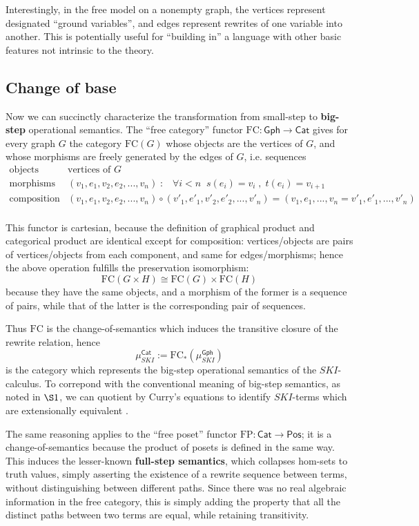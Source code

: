 \documentclass{amsart}
\theoremstyle{definition}
\newcommand{\Gph}{\mathsf{Gph}}
\newcommand{\Cat}{\mathsf{Cat}}
\newcommand{\Pos}{\mathsf{Pos}}
\newcommand{\FC}{\mathrm{FC}}
\newcommand{\FP}{\mathrm{FP}}
\newcommand{\maps}{\colon}
\begin{document}
Interestingly, in the free model on a nonempty graph, the vertices represent designated ``ground variables'', and edges represent rewrites of one variable into another. This is potentially useful for ``building in'' a language with other basic features not intrinsic to the theory.

\subsection{Change of base}
Now we can succinctly characterize the transformation from small-step to \textbf{big-step} operational semantics. The ``free category'' functor $\FC\maps \Gph \to \Cat$ gives for every graph $G$ the category $\FC(G)$ whose objects are the vertices of $G$, and whose morphisms are freely generated by the edges of $G$, i.e. sequences 
\[\begin{array}{rl}
\text{objects} & \text{vertices of } G\\
\text{morphisms} & (v_1,e_1,v_2,e_2,...,v_n) \; : \; \;\; \forall i<n \;\; s(e_i)=v_i \; , \; t(e_i)=v_{i+1}\\
\text{composition} & (v_1,e_1,v_2,e_2,...,v_n) \circ (v'_1,e'_1,v'_2,e'_2,...,v'_n) = (v_1,e_1,...,v_n=v'_1,e'_1,...,v'_n)\\
\end{array}\]

This functor is cartesian, because the definition of graphical product and categorical product are identical except for composition: vertices/objects are pairs of vertices/objects from each component, and same for edges/morphisms; hence the above operation fulfills the preservation isomorphism: $$\FC(G\times H) \cong \FC(G)\times \FC(H)$$ because they have the same objects, and a morphism of the former is a sequence of pairs, while that of the latter is the corresponding pair of sequences.

Thus $\FC$ is the change-of-semantics which induces the transitive closure of the rewrite relation, hence $$\mu_{SKI}^\Cat := \FC_*(\mu_{SKI}^\Gph)$$ is the category which represents the big-step operational semantics of the $SKI$-calculus. To correpond with the conventional meaning of big-step semantics, as noted in $\S1$, we can quotient by Curry's equations to identify $SKI$-terms which are extensionally equivalent \cite{barendregt}.

The same reasoning applies to the ``free poset'' functor $\FP\maps \Cat \to \Pos$; it is a change-of-semantics because the product of posets is defined in the same way. This induces the lesser-known \textbf{full-step semantics}, which collapses hom-sets to truth values, simply asserting the existence of a rewrite sequence between terms, without distinguishing between different paths. Since there was no real algebraic information in the free category, this is simply adding the property that all the distinct paths between two terms are equal, while retaining transitivity.
\end{document}

